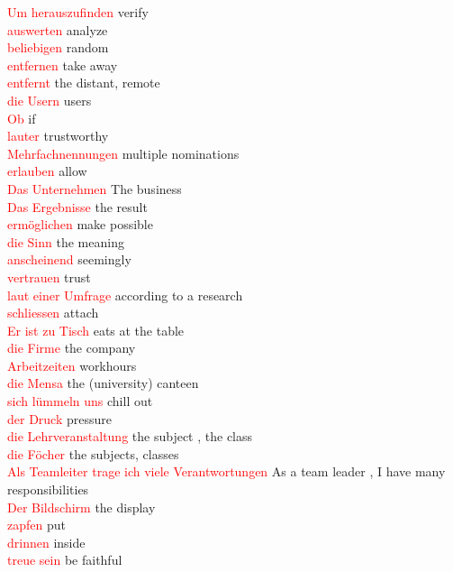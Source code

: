 \documentclass{article}
\begin{document}
\begin{multicols}{2}
	\textcolor{red}{Um herauszufinden} verify\\
	\textcolor{red}{auswerten} analyze \\
	\textcolor{red}{beliebigen} random\\
	\textcolor{red}{entfernen} take away\\
	\textcolor{red}{entfernt}  the distant, remote\\
	\textcolor{red}{die Usern} users\\
	\textcolor{red}{Ob} if\\
	\textcolor{red}{lauter} trustworthy\\
	\textcolor{red}{Mehrfachnennungen} multiple nominations\\
	\textcolor{red}{erlauben} allow\\
	\textcolor{red}{Das Unternehmen} The business\\
	\textcolor{red}{Das Ergebnisse} the result\\
	\textcolor{red}{ermöglichen} make possible\\
	\textcolor{red}{die Sinn} the meaning\\
	\textcolor{red}{anscheinend} seemingly\\
	\textcolor{red}{vertrauen} trust\\
	\textcolor{red}{laut einer Umfrage} according to a research\\
	\textcolor{red}{schliessen} attach\\
	\textcolor{red}{Er ist zu Tisch} eats at the table\\
	\textcolor{red}{die Firme} the company\\
	\textcolor{red}{Arbeitzeiten} workhours\\
	\textcolor{red}{die Mensa} the (university) canteen\\
	\textcolor{red}{sich lümmeln uns} chill out\\
	\textcolor{red}{der Druck} pressure\\
	\textcolor{red}{die Lehrveranstaltung} the subject , the class\\
	\textcolor{red}{die Föcher} the subjects, classes\\
	\textcolor{red}{Als Teamleiter trage ich viele Verantwortungen} As a team leader , I have many responsibilities\\
	\textcolor{red}{Der Bildschirm} the display\\
	\textcolor{red}{zapfen} put\\
	\textcolor{red}{drinnen} inside\\
	\textcolor{red}{treue sein} be faithful \\\\
	

\end{multicols}
\end{document}
